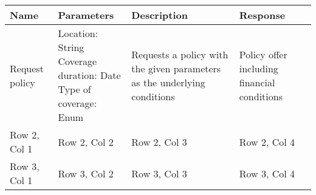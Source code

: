 \renewcommand{\arraystretch}{1.3}
\begin{tabular}{|>{\centering\arraybackslash}m{3cm}|>{\centering\arraybackslash}m{4.5cm}|>{\centering\arraybackslash}m{5cm}|>{\centering\arraybackslash}m{4cm}|}
    \hline
    \textbf{Name} & \textbf{Parameters} & \textbf{Description} & \textbf{Response} \\ 
    \hline
    Request policy & \makecell{Location: String \\ Coverage duration: Date \\ Type of coverage: Enum}  & Requests a policy with the given parameters as the underlying conditions & Policy offer including financial conditions \\ 
    \hline
    Row 2, Col 1 & Row 2, Col 2 & Row 2, Col 3 & Row 2, Col 4 \\ 
    \hline
    Row 3, Col 1 & Row 3, Col 2 & Row 3, Col 3 & Row 3, Col 4 \\ 
    \hline
\end{tabular}